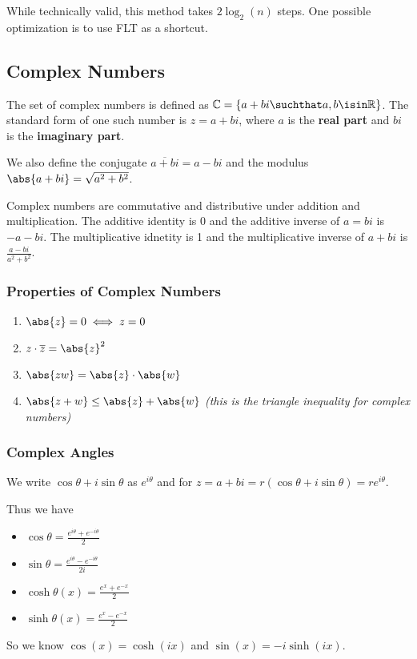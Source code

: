 \documentclass[12pt]{article}
\begin{document}
While technically valid, this method takes $2\log_2 (n)$ steps. One possible optimization is to use FLT as a shortcut.

\subsection*{Complex Numbers}
The set of complex numbers is defined as $\mathbb{C} = \{ a + bi \suchthat a, b \isin \mathbb{R} \}$. The standard form of one such number is $z = a + bi$, where $a$ is the {\bf real part} and $bi$ is the {\bf imaginary part}.

We also define the conjugate $\overline{a + bi} = a - bi$ and the modulus $\abs{a + bi} = \sqrt{a^2 + b^2}$.

Complex numbers are commutative and distributive under addition and multiplication. The additive identity is 0 and the additive inverse of $a = bi$ is $-a - bi$. The multiplicative idnetity is 1 and the multiplicative inverse of $a + bi$ is $\frac{a-bi}{a^2 + b^2}$.

\subsubsection*{Properties of Complex Numbers}
\begin{enumerate}
\item $\abs{z} = 0 \iff z = 0$
\item $z \cdot \overline{z} = \abs{z}^2$
\item $\abs{zw} = \abs{z} \cdot \abs{w}$
\item $\abs{z + w} \leq \abs{z} + \abs{w}$ \emph{(this is the triangle inequality for complex numbers)}
\end{enumerate}

\subsubsection*{Complex Angles}
We write $\cos\theta + i \sin\theta$ as $e^{i\theta}$ and for $z = a + bi = r(\cos\theta + i\sin\theta) = re^{i\theta}$.

Thus we have
\begin{itemize}
\item $\cos\theta = \frac{e^{i\theta} + e^{-i\theta}}{2}$
\item $\sin\theta = \frac{e^{i\theta} - e^{-i\theta}}{2i}$
\item $\cosh\theta(x) = \frac{e^x + e^{-x}}{2}$
\item $\sinh\theta(x) = \frac{e^x - e^{-x}}{2}$
\end{itemize}
So we know $\cos(x) = \cosh(ix)$ and $\sin(x) = -i\sinh(ix)$.
\end{document}
